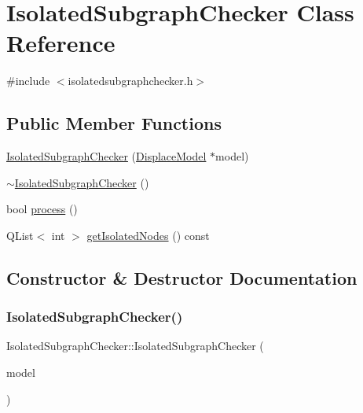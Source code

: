 \hypertarget{class_isolated_subgraph_checker}{}\section{Isolated\+Subgraph\+Checker Class Reference}
\label{class_isolated_subgraph_checker}


{\ttfamily \#include $<$isolatedsubgraphchecker.\+h$>$}

\subsection*{Public Member Functions}
\begin{DoxyCompactItemize}
\item 
\mbox{\hyperlink{class_isolated_subgraph_checker_ab0722b2df842cc941595f0e359905885}{Isolated\+Subgraph\+Checker}} (\mbox{\hyperlink{class_displace_model}{Displace\+Model}} $\ast$model)
\item 
\mbox{\hyperlink{class_isolated_subgraph_checker_a59c5d47dd232d2e8d1290b1a3081e628}{$\sim$\+Isolated\+Subgraph\+Checker}} ()
\item 
bool \mbox{\hyperlink{class_isolated_subgraph_checker_a87b9dc0c9f15d04867840561413ec79c}{process}} ()
\item 
Q\+List$<$ int $>$ \mbox{\hyperlink{class_isolated_subgraph_checker_af2119d850cc6732f828da56d85d4294a}{get\+Isolated\+Nodes}} () const
\end{DoxyCompactItemize}


\subsection{Constructor \& Destructor Documentation}
\mbox{\label{class_isolated_subgraph_checker_ab0722b2df842cc941595f0e359905885}} 
\subsubsection{\texorpdfstring{IsolatedSubgraphChecker()}{IsolatedSubgraphChecker()}}
{\footnotesize\ttfamily Isolated\+Subgraph\+Checker\+::\+Isolated\+Subgraph\+Checker (\begin{DoxyParamCaption}\item[{\mbox{\hyperlink{class_displace_model}{Displace\+Model}} $\ast$}]{model }\end{DoxyParamCaption})}

